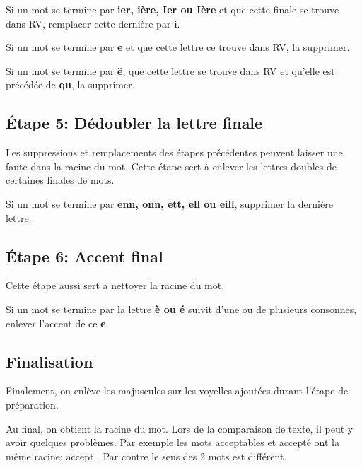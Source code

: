 Si un mot se termine par \textbf{ier, ière, Ier ou Ière} et que cette finale se trouve dans RV, remplacer cette dernière par \textbf{i}.

Si un mot se termine par \textbf{e} et que cette lettre ce trouve dans RV, la supprimer.

Si un mot se termine par \textbf{ë}, que cette lettre se trouve dans RV et qu'elle est précédée de \textbf{qu}, la supprimer.

\subsection*{Étape 5: Dédoubler la lettre finale}

Les suppressions et remplacements des étapes précédentes peuvent laisser une faute dans la racine du mot.
Cette étape sert à enlever les lettres doubles de certaines finales de mots.

Si un mot se termine par \textbf{enn, onn, ett, ell ou eill}, supprimer la dernière lettre.

\subsection*{Étape 6: Accent final}

Cette étape aussi sert a nettoyer la racine du mot.

Si un mot se termine par la lettre \textbf{è ou é} suivit d'une ou de plusieurs consonnes, enlever l'accent de ce \textbf{e}.

\subsection*{Finalisation}

Finalement, on enlève les majuscules sur les voyelles ajoutées durant l'étape de préparation.

Au final, on obtient la racine du mot.
Lors de la comparaison de texte, il peut y avoir quelques problèmes.
Par exemple les mots \og acceptables \fg{} et \og accepté \fg{} ont la même racine: \og accept \fg{}.
Par contre le sens des 2 mots est différent.